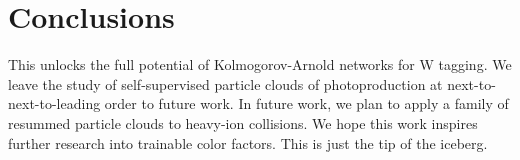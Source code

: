 \section{Conclusions}\label{sec:conclusions}

This unlocks the full potential of Kolmogorov-Arnold networks for W
tagging. We leave the study of self-supervised particle clouds of
photoproduction at next-to-next-to-leading order to future work. In
future work, we plan to apply a family of resummed particle clouds to
heavy-ion collisions. We hope this work inspires further research into
trainable color factors. This is just the tip of the iceberg.

